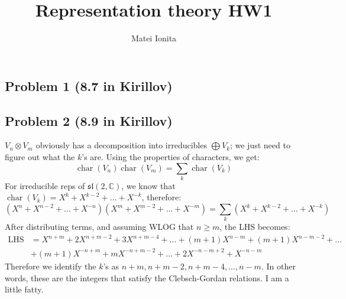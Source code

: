 \documentclass[12 pt]{article}
\title{Representation theory HW1}
\author{Matei Ionita}
\newcommand{\C}{\mathbb{C}}
\newcommand{\fr}{\mathfrak}
\DeclareMathOperator {\ch} {char}
\begin{document}
  \maketitle

\subsection*{Problem 1 (8.7 in Kirillov)}

\subsection*{Problem 2 (8.9 in Kirillov)}
$V_n \otimes V_m$ obviously has a decomposition into irreducibles $\bigoplus V_k$; we just need to figure out what the $k$'s are. Using the properties of characters, we get:
\[    \ch (V_n) \ch (V_m) = \sum_k \ch (V_k)    \]
For irreducible reps of $\fr{sl}(2,\C)$, we know that $\ch (V_k) = X^k + X^{k-2} + \dots + X^{-k}$, therefore:
\[           (X^n + X^{n-2} + \dots + X^{-n})(X^m + X^{m-2} + \dots + X^{-m})   =   \sum_k    ( X^k + X^{k-2} + \dots + X^{-k})           \]
After distributing terms, and assuming WLOG that $n\geq m$, the LHS becomes:
\begin{align*}
  \text{LHS} &=   X^{n+m} + 2 X^{n+m-2} + 3 X^{n+m-4} + \dots +  (m+1) X^{n-m} + (m+1) X^{n-m-2} + \dots           \\
 &+ (m+1) X^{-n +m} + m X^{-n +m -2} + \dots + 2 X^{-n-m+2} + X^{-n-m}
\end{align*}
Therefore we identify the $k$'s as $n+m, n+m -2, n+m - 4, \dots, n-m$. In other words, these are the integers that satisfy the Clebsch-Gordan relations. I am a little fatty.
\end{document}
